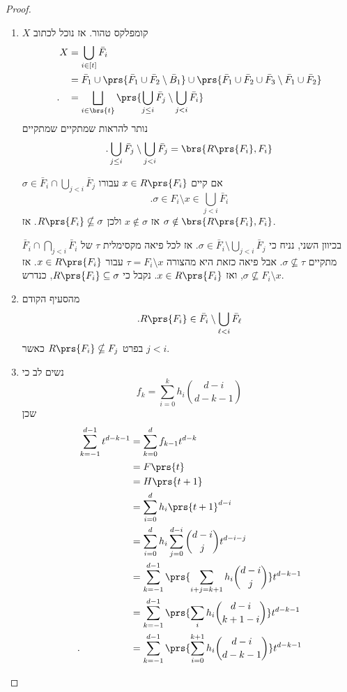\documentclass[a4paper,10pt,twoside,openany]{book}
\begin{document}
\begin{proof}
\begin{enumerate}
\item $X$
קומפלקס טהור. אז נוכל לכתוב
\begin{align*}
X &= \bigcup_{i \in [t]} \bar{F}_i
\\&= \bar{F}_1 \cup \prs{\bar{F}_1 \cup \bar{F}_2 \setminus \bar{B}_1} \cup \prs{\bar{F}_1 \cup \bar{F}_2 \cup \bar{F}_3 \setminus \bar{F}_1 \cup \bar{F}_2}
\\ \text{.} \hphantom{X} &= \bigsqcup_{i \in \brs{t}} \prs{\bigcup_{j \leq i} \bar{F}_j \setminus \bigcup_{j < i} \bar{F}_i}
\end{align*}
נותר להראות שמתקיים שמתקיים
\[\text{.} \bigcup_{j \leq i} \bar{F}_j \setminus \bigcup_{j < i} \bar{F}_j = \brs{R\prs{F_i}, F_i}\]

$\sigma \in \bar{F}_i \cap \bigcup_{j < i} \bar{F}_j$
אם קיים
$x \in R\prs{F_i}$
עבורו
\[\text{.} \sigma \in F_i \setminus x \in \bigcup_{j < i} \bar{F}_i\]
אז
$x \notin \sigma$
ולכן
$R\prs{F_i} \nsubseteq \sigma$.
אז
$\sigma \notin \brs{R\prs{F_i}, F_i}$.

בכיוון השני, נניח כי
$\sigma \in \bar{F}_i \setminus \bigcup_{j < i} \bar{F}_j$.
אז לכל פיאה מקסימלית
$\tau$
של
$\bar{F}_i \cap \bigcap_{j < i} \bar{F}_i$
מתקיים
$\sigma \nsubseteq \tau$.
אבל פיאה כזאת היא מהצורה
$\tau = F_i \setminus x$
עבור
$x \in R\prs{F_i}$.
אז
$\sigma \nsubseteq F_i \setminus x$,
ואז
$x \in R\prs{F_i}$.
נקבל כי
$R\prs{F_i} \subseteq \sigma$,
כנדרש.
\item מהסעיף הקודם
\[\text{.} R\prs{F_i} \in \bar{F}_i \setminus \bigcup_{\ell < i} \bar{F}_\ell\]
בפרט
$R\prs{F_i} \nsubseteq F_j$
כאשר
$j < i$.
\item
נשים לב כי
\[f_k = \sum_{i=0}^k h_i \binom{d-i}{d-k-1}\]
שכן
\begin{align*}
\sum_{k=-1}^{d-1} t^{d-k-1} &= \sum_{k=0}^d f_{k-1} t^{d-k}
\\&= F\prs{t}
\\&= H\prs{t+1}
\\&= \sum_{i=0}^d h_i \prs{t+1}^{d-i}
\\&= \sum_{i=0}^d h_i \sum_{j=0}^{d-i} \binom{d-i}{j} t^{d-i-j}
\\&= \sum_{k=-1}^{d-1} \prs{\sum_{i+j = k+1} h_i \binom{d-i}{j}} t^{d-k-1}
\\&= \sum_{k=-1}^{d-1} \prs{\sum_i h_i \binom{d-i}{k+1-i}} t^{d-k-1}
\\ \text{.} \hphantom{\sum_{k=-1}^{d-1} t^{d-k-1}} &= \sum_{k=-1}^{d-1} \prs{\sum_{i=0}^{k+1} h_i \binom{d-i}{d-k-1}} t^{d-k-1}
\end{align*}


\end{enumerate}
\end{proof}
\end{document}
